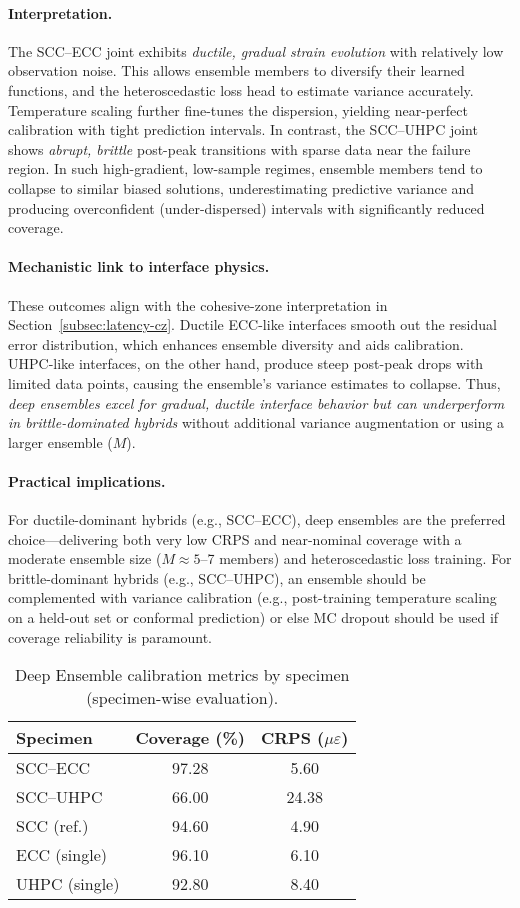 \documentclass{article}
\begin{document}
\paragraph{Interpretation.} The SCC–ECC joint exhibits \emph{ductile, gradual strain evolution} with relatively low observation noise. This allows ensemble members to diversify their learned functions, and the heteroscedastic loss head to estimate variance accurately. Temperature scaling further fine-tunes the dispersion, yielding near-perfect calibration with tight prediction intervals. In contrast, the SCC–UHPC joint shows \emph{abrupt, brittle} post-peak transitions with sparse data near the failure region. In such high-gradient, low-sample regimes, ensemble members tend to collapse to similar biased solutions, underestimating predictive variance and producing overconfident (under-dispersed) intervals with significantly reduced coverage.

\paragraph{Mechanistic link to interface physics.} These outcomes align with the cohesive-zone interpretation in Section~\ref{subsec:latency-cz}. Ductile ECC-like interfaces smooth out the residual error distribution, which enhances ensemble diversity and aids calibration. UHPC-like interfaces, on the other hand, produce steep post-peak drops with limited data points, causing the ensemble’s variance estimates to collapse. Thus, \emph{deep ensembles excel for gradual, ductile interface behavior but can underperform in brittle-dominated hybrids} without additional variance augmentation or using a larger ensemble ($M$).

\paragraph{Practical implications.} For ductile-dominant hybrids (e.g., SCC–ECC), deep ensembles are the preferred choice—delivering both very low CRPS and near-nominal coverage with a moderate ensemble size ($M\approx5$–7 members) and heteroscedastic loss training. For brittle-dominant hybrids (e.g., SCC–UHPC), an ensemble should be complemented with variance calibration (e.g., post-training temperature scaling on a held-out set or conformal prediction) or else MC dropout should be used if coverage reliability is paramount.


\begin{table}[h]
\centering
\caption{Deep Ensemble calibration metrics by specimen (specimen-wise evaluation).}
\label{tab:deep_ens_specimens_full}
\begin{tabular}{lcc}
\hline
Specimen & Coverage (\%) & CRPS ($\mu\varepsilon$) \\
\hline
SCC--ECC & 97.28 & 5.60 \\
SCC--UHPC & 66.00 & 24.38 \\
SCC (ref.) & 94.60 & 4.90 \\
ECC (single) & 96.10 & 6.10 \\
UHPC (single) & 92.80 & 8.40 \\
\hline
\end{tabular}
\end{table}
\end{document}
